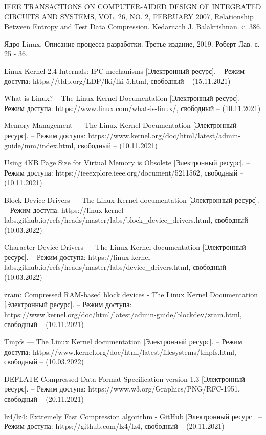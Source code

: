 \begin{thebibliography}{}
	IEEE TRANSACTIONS ON COMPUTER-AIDED DESIGN OF INTEGRATED CIRCUITS AND SYSTEMS, VOL. 26, NO. 2, FEBRUARY 2007, Relationship Between Entropy and Test Data Compression. Kedarnath J. Balakrishnan. с. 386.
	
	Ядро Linux. Описание процесса разработки. Третье издание, 2019. Роберт Лав. с. 25 - 36.
	
	Linux Kernel 2.4 Internals: IPC mechanisms [Электронный ресурс]. – Режим доступа: https://tldp.org/LDP/lki/lki-5.html, свободный – (15.11.2021)
	 
	 What is Linux? -- The Linux Kernel Documentation [Электронный ресурс]. – Режим доступа: https://www.linux.com/what-is-linux/, свободный – (10.11.2021)
	
	Memory Management — The Linux Kernel Documentation [Электронный ресурс]. – Режим доступа: https://www.kernel.org/doc/html/latest/admin-guide/mm/index.html, свободный – (10.11.2021)
	
	Using 4KB Page Size for Virtual Memory is Obsolete [Электронный ресурс]. – Режим доступа: https://ieeexplore.ieee.org/document/5211562, свободный – (10.11.2021)
	
	Block Device Drivers — The Linux Kernel documentation [Электронный ресурс]. – Режим доступа: 	https://linux-kernel-labs.github.io/refs/heads/master/labs/block\_device\_drivers.html, свободный – (10.03.2022)
	
	Character Device Drivers — The Linux Kernel documentation [Электронный ресурс]. – Режим доступа: 		https://linux-kernel-labs.github.io/refs/heads/master/labs/device\_drivers.html, свободный – (10.03.2022)
	
	zram: Compressed RAM-based block devices - The Linux Kernel Documentation [Электронный ресурс]. – Режим доступа: https://www.kernel.org/doc/html/latest/admin-guide/blockdev/zram.html, свободный – (10.11.2021)
	
	Tmpfs — The Linux Kernel documentation [Электронный ресурс]. – Режим доступа: https://www.kernel.org/doc/html/latest/filesystems/tmpfs.html, свободный – (10.03.2022)
	
	DEFLATE Compressed Data Format Specification version 1.3 [Электронный ресурс]. – Режим доступа: https://www.w3.org/Graphics/PNG/RFC-1951, свободный – (20.11.2021)
	
	lz4/lz4: Extremely Fast Compression algorithm - GitHub [Электронный ресурс]. – Режим доступа: https://github.com/lz4/lz4, свободный – (20.11.2021)
	

\end{thebibliography}

